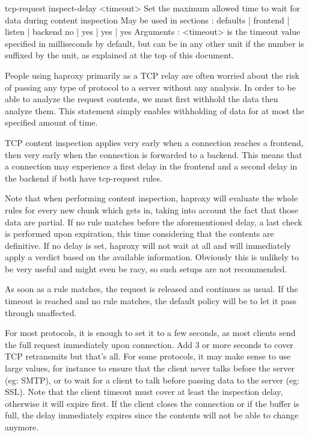 tcp-request inspect-delay <timeout>
  Set the maximum allowed time to wait for data during content inspection
  May be used in sections :   defaults | frontend | listen | backend
                                 no    |    yes   |   yes  |   yes
  Arguments :
    <timeout> is the timeout value specified in milliseconds by default, but
              can be in any other unit if the number is suffixed by the unit,
              as explained at the top of this document.

  People using haproxy primarily as a TCP relay are often worried about the
  risk of passing any type of protocol to a server without any analysis. In
  order to be able to analyze the request contents, we must first withhold
  the data then analyze them. This statement simply enables withholding of
  data for at most the specified amount of time.

  TCP content inspection applies very early when a connection reaches a
  frontend, then very early when the connection is forwarded to a backend. This
  means that a connection may experience a first delay in the frontend and a
  second delay in the backend if both have tcp-request rules.

  Note that when performing content inspection, haproxy will evaluate the whole
  rules for every new chunk which gets in, taking into account the fact that
  those data are partial. If no rule matches before the aforementioned delay,
  a last check is performed upon expiration, this time considering that the
  contents are definitive. If no delay is set, haproxy will not wait at all
  and will immediately apply a verdict based on the available information.
  Obviously this is unlikely to be very useful and might even be racy, so such
  setups are not recommended.

  As soon as a rule matches, the request is released and continues as usual. If
  the timeout is reached and no rule matches, the default policy will be to let
  it pass through unaffected.

  For most protocols, it is enough to set it to a few seconds, as most clients
  send the full request immediately upon connection. Add 3 or more seconds to
  cover TCP retransmits but that's all. For some protocols, it may make sense
  to use large values, for instance to ensure that the client never talks
  before the server (eg: SMTP), or to wait for a client to talk before passing
  data to the server (eg: SSL). Note that the client timeout must cover at
  least the inspection delay, otherwise it will expire first. If the client
  closes the connection or if the buffer is full, the delay immediately expires
  since the contents will not be able to change anymore.

